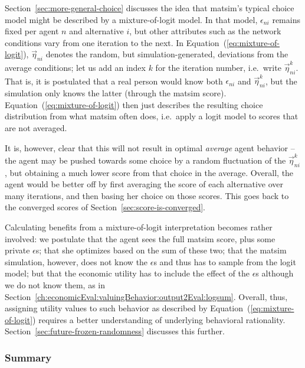 Section~\ref{sec:more-general-choice} discusses the idea that \gls{matsim}'s typical choice model might be described by a mixture-of-logit model.  In that model,  $\epsilon_{ni}$ remains fixed per agent $n$ and alternative $i$, but other attributes such as the network conditions vary from one iteration to the next.  
%
In Equation~(\ref{eq:mixture-of-logit}), $\vec\eta_{ni}$ denotes the random, but simulation-generated, deviations from the average conditions; let us add an index $k$ for the iteration number, i.e.\ write $\vec\eta_{ni}^k$.  That is, it is postulated that a real person would know both $\epsilon_{ni}$ and $\vec\eta_{ni}^k$, but the simulation only knows the latter (through the \gls{matsim} score).  
%
Equation~(\ref{eq:mixture-of-logit}) then just describes the resulting choice distribution from what \gls{matsim} often does, i.e.\ apply a logit model to scores that are not averaged.

It is, however, clear that this will not result in optimal \emph{average} agent behavior -- the agent may be pushed towards some choice by a random fluctuation of the $\vec\eta_{ni}^k$, but obtaining a much lower score from that choice in the average.  Overall, the agent would be better off by first averaging the score of each alternative over many iterations, and then basing her choice on those scores.  This goes back to the converged scores of Section~\ref{sec:score-is-converged}.

Calculating benefits from a mixture-of-logit interpretation becomes rather involved: we postulate that the agent sees the full \gls{matsim} score, plus some private $\epsilon$s; that she optimizes based on the sum of these two; that the \gls{matsim} simulation, however, does not know the $\epsilon$s and thus has to sample from the logit model; but that the economic utility has to include the effect of the $\epsilon$s although we do not know them, as in Section~\ref{ch:economicEval:valuingBehavior:output2Eval:logsum}.  Overall, thus, assigning utility values to such behavior as described by Equation~(\ref{eq:mixture-of-logit}) requires a better understanding of  underlying behavioral rationality.  Section~\ref{sec:future-frozen-randomness} discusses this  further.



\subsubsection{Summary}
\label{ch:economicEval:valuingBehavior:output2Eval:summary}

